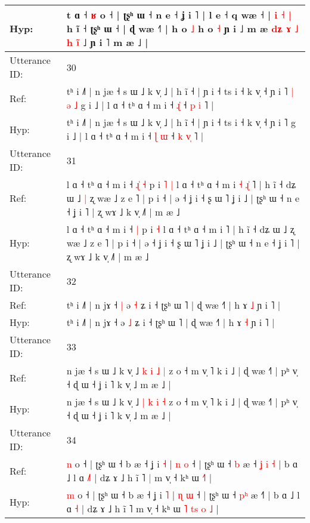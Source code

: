 \documentclass[10pt]{article}
\DeclareRobustCommand{\hl}[1]{{\textcolor{red}{#1}}}
\begin{document}
\begin{longtable}{ll}
 \\
Hyp: & t ɑ ˧ \hl{ʁ} o ˧ | ʈʂʰ ɯ ˧ n e ˧ ʝ i ˥ | l e ˧ q wæ ˧\hl{} | \hl{i} \hl{}\hl{˧} \hl{|} h ĩ ˧ ʈʂʰ ɯ ˧ | ɖ wæ ˧˥ | h o \hl{˩} h o \hl{˧} ɲ i ˩ m æ \hl{d}\hl{ʑ} \hl{ɤ} \hl{˩}\hl{ }\hl{h} \hl{i}\hl{̃} ˩ ɲ i ˥ m æ ˩ |
 \\
\midrule
Utterance ID: & 30 \\
Ref: & tʰ i ˩˥ | n jæ ˧ s ɯ ˩ k v̩ ˩ | h ĩ ˧ | ɲ i ˧ ts i ˧ k v̩ ˧ ɲ i ˥\hl{ }\hl{|}\hl{ }\hl{ə}\hl{ }\hl{˩} g i ˩ | l ɑ ˧ tʰ ɑ ˧ m i ˧ \hl{}\hl{ɻ}\hl{̍} ˧ \hl{p} \hl{}\hl{i} ˥ |
 \\
Hyp: & tʰ i ˩˥ | n jæ ˧ s ɯ ˩ k v̩ ˩ | h ĩ ˧ | ɲ i ˧ ts i ˧ k v̩ ˧ ɲ i ˥\hl{}\hl{}\hl{}\hl{}\hl{}\hl{} g i ˩ | l ɑ ˧ tʰ ɑ ˧ m i ˧ \hl{ɭ}\hl{ }\hl{ɯ} ˧ \hl{k} \hl{v}\hl{̩} ˥ |
 \\
\midrule
Utterance ID: & 31 \\
Ref: & l ɑ ˧ tʰ ɑ ˧ m i ˧\hl{ }\hl{ɻ}\hl{̍} \hl{˧} p i\hl{ }\hl{˥} \hl{|} l ɑ ˧ tʰ ɑ ˧ m i\hl{ }\hl{˧}\hl{ }\hl{ɻ}\hl{̍} ˥ | h ĩ ˧ dʑ ɯ ˩\hl{ }\hl{|} ʐ wæ ˩ z e ˥ | p i ˧ | ə ˧ ʝ i ˧ ʂ ɯ ˥ ʝ i ˩ | ʈʂʰ ɯ ˧ n e ˧ ʝ i ˥ | ʐ wɤ ˩ k v̩ ˩˥ | m æ ˩
 \\
Hyp: & l ɑ ˧ tʰ ɑ ˧ m i ˧\hl{}\hl{}\hl{} \hl{|} p i\hl{}\hl{} \hl{˧} l ɑ ˧ tʰ ɑ ˧ m i\hl{}\hl{}\hl{}\hl{}\hl{} ˥ | h ĩ ˧ dʑ ɯ ˩\hl{}\hl{} ʐ wæ ˩ z e ˥ | p i ˧ | ə ˧ ʝ i ˧ ʂ ɯ ˥ ʝ i ˩ | ʈʂʰ ɯ ˧ n e ˧ ʝ i ˥ | ʐ wɤ ˩ k v̩ ˩˥ | m æ ˩
 \\
\midrule
Utterance ID: & 32 \\
Ref: & tʰ i ˩˥ | n jɤ ˧\hl{ }\hl{|} ə \hl{˧} ʑ i ˧ ʈʂʰ ɯ ˥ | ɖ wæ ˧˥ | h ɤ \hl{˩} ɲ i ˥ |
 \\
Hyp: & tʰ i ˩˥ | n jɤ ˧\hl{}\hl{} ə \hl{˩} ʑ i ˧ ʈʂʰ ɯ ˥ | ɖ wæ ˧˥ | h ɤ \hl{˧} ɲ i ˥ |
 \\
\midrule
Utterance ID: & 33 \\
Ref: & n jæ ˧ s ɯ ˩ k v̩ ˩ \hl{k} \hl{i} \hl{˩} \hl{|} z o ˧ m v̩ ˥ k i ˩ | ɖ wæ ˧˥ | pʰ v̩ ˧ ɖ ɯ ˧ ʝ i ˥ k v̩ ˩ m æ ˩ |
 \\
Hyp: & n jæ ˧ s ɯ ˩ k v̩ ˩ \hl{|} \hl{k} \hl{i} \hl{˧} z o ˧ m v̩ ˥ k i ˩ | ɖ wæ ˧˥ | pʰ v̩ ˧ ɖ ɯ ˧ ʝ i ˥ k v̩ ˩ m æ ˩ |
 \\
\midrule
Utterance ID: & 34 \\
Ref: & \hl{n} o ˧ | ʈʂʰ ɯ ˧ b æ ˧ ʝ i \hl{˧} | \hl{n} \hl{o} ˧ | ʈʂʰ ɯ ˧ \hl{}\hl{b} æ ˧\hl{ }\hl{ʝ}\hl{ }\hl{i}\hl{ }\hl{˧} | b ɑ ˩ l ɑ \hl{˩}\hl{˥} | dʑ ɤ ˩ h ĩ ˥\hl{ }\hl{|} m v̩ ˧ kʰ ɯ\hl{}\hl{}\hl{}\hl{}\hl{} \hl{}\hl{˧}\hl{˥} |
 \\
Hyp: & \hl{m} o ˧ | ʈʂʰ ɯ ˧ b æ ˧ ʝ i \hl{˥} | \hl{ɳ} \hl{ɯ} ˧ | ʈʂʰ ɯ ˧ \hl{p}\hl{ʰ} æ ˧\hl{}\hl{}\hl{}\hl{}\hl{}\hl{˥} | b ɑ ˩ l ɑ \hl{}\hl{˧} | dʑ ɤ ˩ h ĩ ˥\hl{}\hl{} m v̩ ˧ kʰ ɯ\hl{ }\hl{˥}\hl{ }\hl{t}\hl{s} \hl{o}\hl{ }\hl{˩} |

\end{longtable}
\end{document}
